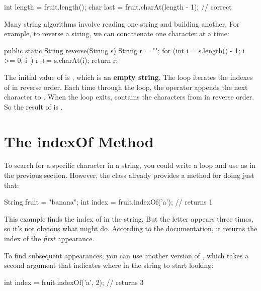 \begin{code}
int length = fruit.length();
char last = fruit.charAt(length - 1);  // correct
\end{code}

Many string algorithms involve reading one string and building another.
For example, to reverse a string, we can concatenate one character at a time:

\begin{code}
public static String reverse(String s) {
    String r = "";
    for (int i = s.length() - 1; i >= 0; i--) {
        r += s.charAt(i);
    }
    return r;
}
\end{code}


The initial value of  is , which is an {\bf empty string}.
The loop iterates the indexes of  in reverse order.
Each time through the loop, the \java{+=} operator appends the next character to .
When the loop exits,  contains the characters from  in reverse order.
So the result of  is .


\section{The indexOf Method}


To search for a specific character in a string, you could write a  loop and use  as in the previous section.
However, the  class already provides a method for doing just that:

\begin{code}
String fruit = "banana";
int index = fruit.indexOf('a');     // returns 1
\end{code}

This example finds the index of  in the string.
But the letter appears three times, so it's not obvious what  might do.
According to the documentation, it returns the index of the {\em first} appearance.

To find subsequent appearances, you can use another version of , which takes a second argument that indicates where in the string to start looking:

\begin{code}
int index = fruit.indexOf('a', 2);  // returns 3
\end{code}

